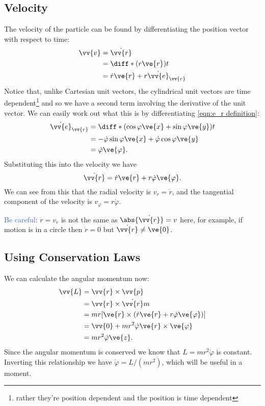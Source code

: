 \documentclass[fleqn]{NotesClass}
\newcommand*{\vedot}[1]{\dot{\vv{e}}_{\vv{#1}}}
\begin{document}
    \subsection{Velocity}
    The velocity of the particle can be found by differentiating the position vector with respect to time:
    \begin{align}
        \vv{v} &= \dot{\vv{r}}\\
        &= \diff*{(r\ve{r})}{t}\\
        &= \dot{r}\ve{r} + r\vedot{r}
    \end{align}
    Notice that, unlike Cartesian unit vectors, the cylindrical unit vectors are time dependent\footnote{rather they're position dependent and the position is time dependent} and so we have a second term involving the derivative of the unit vector.
    We can easily work out what this is by differentiating \cref{eqn:e_r definition}:
    \begin{align}
        \vedot{r} &= \diff*{(\cos\varphi\ve{x} + \sin\varphi\ve{y})}{t}\\
        &= -\dot{\varphi}\sin\varphi\ve{x} + \dot{\varphi}\cos\varphi\ve{y}\\
        &= \dot{\varphi}\ve{\varphi}.
    \end{align}
    Substituting this into the velocity we have
    \begin{equation}
        \dot{\vv{r}} = \dot{r}\ve{r} + r\dot{\varphi}\ve{\varphi}.
    \end{equation}
    We can see from this that the radial velocity is \(v_r = \dot{r}\), and the tangential component of the velocity is \(v_\varphi = r\dot{\varphi}\).
    
    \textcolor{highlight}{Be careful}: \(\dot{r} = v_r\) is not the same as \(\abs{\dot{\vv{r}}} = v\) here, for example, if motion is in a circle then \(\dot{r} = 0\) but \(\dot{\vv{r}} \ne \ve{0}\).
    
    \subsection{Using Conservation Laws}
    We can calculate the angular momentum now:
    \begin{align}
        \vv{L} &= \vv{r}\times\vv{p}\\
        &= \vv{r}\times\dot{\vv{r}}m\\
        &= mr[\ve{r} \times (\dot{r}\ve{r} + r\dot{\varphi}\ve{\varphi})]\\
        &= \vv{0} + mr^2\dot{\varphi}\ve{r}\times\ve{\varphi}\\
        &= mr^2\dot{\varphi}\ve{z}.
    \end{align}
    Since the angular momentum is conserved we know that \(L = mr^2\dot{\varphi}\) is constant.
    Inverting this relationship we have \(\dot{\varphi} = L/(mr^2)\), which will be useful in a moment.
    
\end{document}
